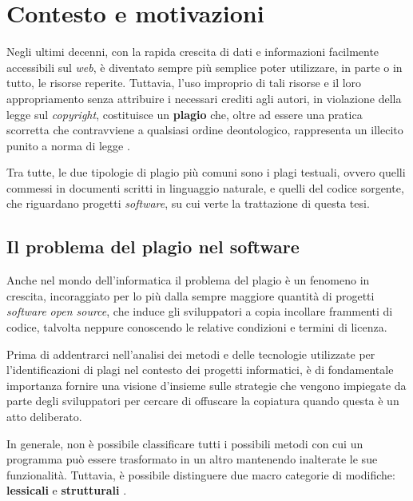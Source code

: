 \chapter{Contesto e motivazioni}
\label{chapter:context-and-motivations}

Negli ultimi decenni, con la rapida crescita di dati e informazioni facilmente accessibili sul \textit{web}, è diventato sempre più semplice poter utilizzare, in parte o in tutto, le risorse reperite.
%
Tuttavia, l'uso improprio di tali risorse e il loro appropriamento senza attribuire i necessari crediti agli autori, in violazione della legge sul \textit{copyright}, costituisce un \textbf{plagio} \cite{britannica} che, oltre ad essere una pratica scorretta che contravviene a qualsiasi ordine deontologico, rappresenta un illecito punito a norma di legge \cite{copyright-law-italia}.

Tra tutte, le due tipologie di plagio più comuni sono i plagi testuali, ovvero quelli commessi in documenti scritti in linguaggio naturale, e quelli del codice sorgente, che riguardano progetti \textit{software}, su cui verte la trattazione di questa tesi.

\section{Il problema del plagio nel software}
Anche nel mondo dell'informatica il problema del plagio è un fenomeno in crescita, incoraggiato per lo più dalla sempre maggiore quantità di progetti \textit{software} \textit{open source}, che induce gli sviluppatori a copia incollare frammenti di codice, talvolta neppure conoscendo le relative condizioni e termini di licenza.

Prima di addentrarci nell'analisi dei metodi e delle tecnologie utilizzate per l'identificazioni di plagi nel contesto dei progetti informatici, è di fondamentale importanza fornire una visione d'insieme sulle strategie che vengono impiegate da parte degli sviluppatori per cercare di offuscare la copiatura quando questa è un atto deliberato.

In generale, non è possibile classificare tutti i possibili metodi con cui un programma può essere trasformato in un altro mantenendo inalterate le sue funzionalità.
%
Tuttavia, è possibile distinguere due macro categorie di modifiche: \textbf{lessicali} e \textbf{strutturali} \cite{joy-99}.

